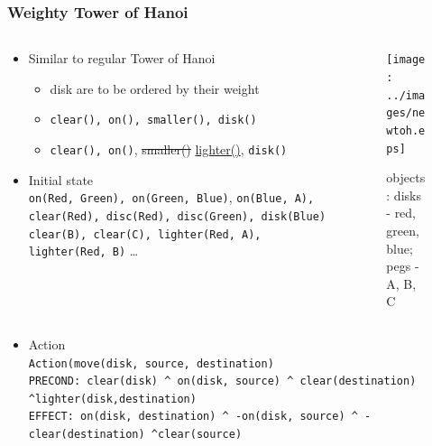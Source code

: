 \documentclass[compress, 9pt]{beamer}
\begin{document}
\begin{frame}
\frametitle{Weighty Tower of Hanoi}
\label{sec-1-3}
\begin{columns}
\begin{column}{0.6\textwidth}
\label{sec-1-3-1}
\begin{itemize}

\item <1-> Similar to regular Tower of Hanoi
\label{sec-1-3-1-1}%
\begin{itemize}

\item disk are to be ordered by their weight
\label{sec-1-3-1-1-1}%

\item \texttt{clear(), on(), smaller(), disk()}
\label{sec-1-3-1-1-2}%

\item <2-> \texttt{clear(), on()}, \st{smaller()} \underline{lighter()}, \texttt{disk()}
\label{sec-1-3-1-1-3}%
\end{itemize} %

\item <3-> Initial state\\
\label{sec-1-3-1-2}%
\texttt{on(Red, Green), on(Green, Blue)},
  \texttt{on(Blue, A), clear(Red), disc(Red), disc(Green), disk(Blue)}
  \texttt{clear(B), clear(C), lighter(Red, A), lighter(Red, B)} \ldots{}
\end{itemize} %
\end{column}
\begin{column}{0.5\textwidth}
\label{sec-1-3-2}

 \begin{figure}[htb]
 \centering
 \texttt{[image: ../images/newtoh.eps]}
 \caption{objects: disks - red, green, blue; pegs - A, B, C}
 \end{figure}
\end{column}
\end{columns}
\label{sec-1-3-3}
\begin{itemize}

\item <4-> Action\\
\label{sec-1-3-3-1}%
\texttt{Action(move(disk, source, destination)}\\
             \texttt{PRECOND: clear(disk) \textasciicircum{} on(disk, source) \textasciicircum{} clear(destination)}
    \texttt{\textasciicircum{}lighter(disk,destination)}\\
             \texttt{EFFECT: on(disk, destination) \textasciicircum{} -on(disk, source) \textasciicircum{} -clear(destination) \textasciicircum{}clear(source)}

\end{itemize} %
\end{frame}
\end{document}
